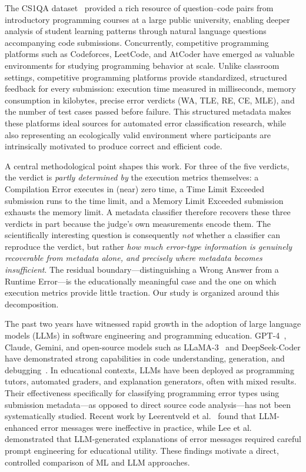 \documentclass[acmsmall]{acmart}
\begin{document}
The CS1QA dataset~\cite{lee2022cs1qa} provided a rich resource
of question--code pairs from introductory programming courses at a large
public university, enabling deeper analysis of student learning patterns
through natural language questions accompanying code submissions.
Concurrently, competitive programming platforms such as Codeforces, LeetCode,
and AtCoder have emerged as valuable environments for studying programming
behavior at scale. Unlike classroom settings, competitive programming
platforms provide standardized, structured feedback for every submission:
execution time measured in milliseconds, memory consumption in kilobytes,
precise error verdicts (WA, TLE, RE, CE, MLE), and the number of test cases
passed before failure. This structured metadata makes these platforms ideal
sources for automated error classification research, while also representing
an ecologically valid environment where participants are intrinsically
motivated to produce correct and efficient code.

A central methodological point shapes this work. For three of the five
verdicts, the verdict is \emph{partly determined by} the execution metrics
themselves: a Compilation Error executes in (near) zero time, a Time Limit
Exceeded submission runs to the time limit, and a Memory Limit Exceeded
submission exhausts the memory limit. A metadata classifier therefore recovers
these three verdicts in part because the judge's own measurements encode them.
The scientifically interesting question is consequently \emph{not} whether a
classifier can reproduce the verdict, but rather \emph{how much error-type
information is genuinely recoverable from metadata alone, and precisely where
metadata becomes insufficient}. The residual boundary---distinguishing a Wrong
Answer from a Runtime Error---is the educationally meaningful case and the one
on which execution metrics provide little traction. Our study is organized
around this decomposition.

The past two years have witnessed rapid growth in the adoption of large
language models (LLMs) in software engineering and programming education.
GPT-4~\cite{openai2024gpt4}, Claude, Gemini, and open-source models such as
LLaMA-3~\cite{dubey2024llama} and DeepSeek-Coder have demonstrated strong
capabilities in code understanding, generation, and
debugging~\cite{raihan2025large,zamfirescu2023what,prather2024code,
kazemitabaar2024impact}. In educational contexts, LLMs have been deployed as
programming tutors, automated graders, and explanation generators, often with
mixed results. Their effectiveness specifically for classifying
programming error types using submission metadata---as opposed to direct
source code analysis---has not been systematically studied. Recent work by
Leerentveld et al.~\cite{leerentveld2024not}
found that LLM-enhanced error messages were ineffective in practice,
while Lee et al.~\cite{lee2024code}
demonstrated that LLM-generated explanations of error messages required
careful prompt engineering for educational utility. These findings
motivate a direct, controlled comparison of ML and LLM approaches.
\end{document}
